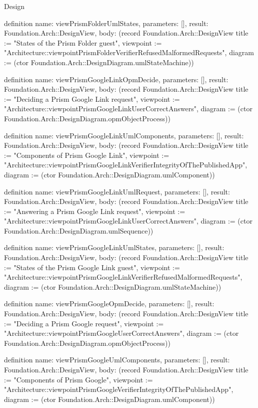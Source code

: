 \begin{lexlean}{Design}
\begin{semanticmodule}
definition{
  name: viewPrismFolderUmlStates,
  parameters: [],
  result: Foundation.Arch::DesignView,
  body: (record Foundation.Arch::DesignView {title := "States of the Prism Folder guest", viewpoint := "Architecture::viewpointPrismFolderVerifierRefusedMalformedRequests", diagram := (ctor Foundation.Arch::DesignDiagram.umlStateMachine)})
}

definition{
  name: viewPrismGoogleLinkOpmDecide,
  parameters: [],
  result: Foundation.Arch::DesignView,
  body: (record Foundation.Arch::DesignView {title := "Deciding a Prism Google Link request", viewpoint := "Architecture::viewpointPrismGoogleLinkUserCorrectAnswers", diagram := (ctor Foundation.Arch::DesignDiagram.opmObjectProcess)})
}

definition{
  name: viewPrismGoogleLinkUmlComponents,
  parameters: [],
  result: Foundation.Arch::DesignView,
  body: (record Foundation.Arch::DesignView {title := "Components of Prism Google Link", viewpoint := "Architecture::viewpointPrismGoogleLinkVerifierIntegrityOfThePublishedApp", diagram := (ctor Foundation.Arch::DesignDiagram.umlComponent)})
}

definition{
  name: viewPrismGoogleLinkUmlRequest,
  parameters: [],
  result: Foundation.Arch::DesignView,
  body: (record Foundation.Arch::DesignView {title := "Answering a Prism Google Link request", viewpoint := "Architecture::viewpointPrismGoogleLinkUserCorrectAnswers", diagram := (ctor Foundation.Arch::DesignDiagram.umlSequence)})
}

definition{
  name: viewPrismGoogleLinkUmlStates,
  parameters: [],
  result: Foundation.Arch::DesignView,
  body: (record Foundation.Arch::DesignView {title := "States of the Prism Google Link guest", viewpoint := "Architecture::viewpointPrismGoogleLinkVerifierRefusedMalformedRequests", diagram := (ctor Foundation.Arch::DesignDiagram.umlStateMachine)})
}

definition{
  name: viewPrismGoogleOpmDecide,
  parameters: [],
  result: Foundation.Arch::DesignView,
  body: (record Foundation.Arch::DesignView {title := "Deciding a Prism Google request", viewpoint := "Architecture::viewpointPrismGoogleUserCorrectAnswers", diagram := (ctor Foundation.Arch::DesignDiagram.opmObjectProcess)})
}

definition{
  name: viewPrismGoogleUmlComponents,
  parameters: [],
  result: Foundation.Arch::DesignView,
  body: (record Foundation.Arch::DesignView {title := "Components of Prism Google", viewpoint := "Architecture::viewpointPrismGoogleVerifierIntegrityOfThePublishedApp", diagram := (ctor Foundation.Arch::DesignDiagram.umlComponent)})
}


\end{semanticmodule}
\end{lexlean}
